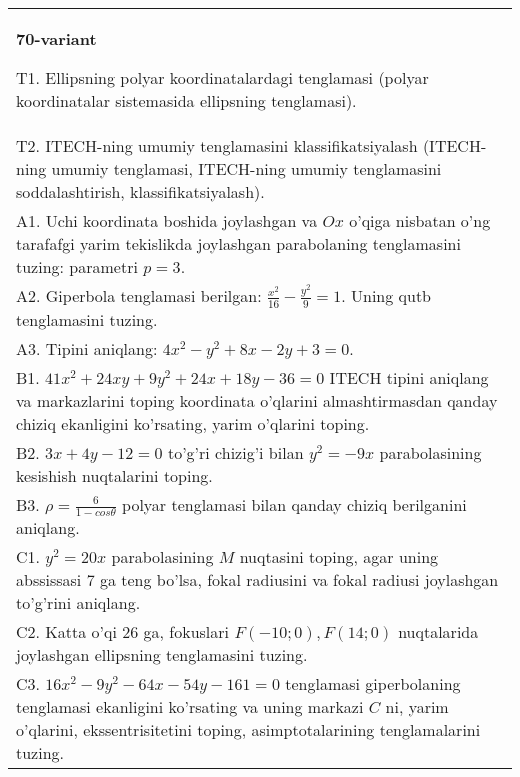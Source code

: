 \documentclass{article}
\begin{document}
\begin{tabular}{m{17cm}}
\textbf{70-variant}
\newline

T1. Ellipsning polyar koordinatalardagi tenglamasi (polyar koordinatalar sistemasida ellipsning tenglamasi).\\

T2. ITECH-ning umumiy tenglamasini klassifikatsiyalash (ITECH-ning umumiy tenglamasi, ITECH-ning umumiy tenglamasini soddalashtirish, klassifikatsiyalash).\\

A1. Uchi koordinata boshida joylashgan va $Ox$ o'qiga nisbatan o'ng tarafafgi yarim tekislikda joylashgan parabolaning tenglamasini tuzing: parametri $p=3$.\\

A2. Giperbola tenglamasi berilgan: $\frac{x^{2}}{16}-\frac{y^{2}}{9}=1$. Uning qutb tenglamasini tuzing.\\

A3. Tipini aniqlang: $4x^{2}-y^{2}+8x-2y+3=0$.\\

B1. $41x^{2} + 24xy + 9y^{2} + 24x + 18y - 36 = 0$ ITECH tipini aniqlang va markazlarini toping koordinata o'qlarini almashtirmasdan qanday chiziq ekanligini ko'rsating, yarim o'qlarini toping.  \\

B2. $3x + 4y - 12 = 0$ to'g'ri chizig'i bilan $y^{2} = - 9x$ parabolasining kesishish nuqtalarini toping.  \\

B3. $\rho = \frac{6}{1 - cos\theta}$ polyar tenglamasi bilan qanday chiziq berilganini aniqlang.  \\

C1. $y^{2} = 20x$ parabolasining $M$ nuqtasini toping, agar uning abssissasi 7 ga teng bo'lsa, fokal radiusini va fokal radiusi joylashgan to'g'rini aniqlang.\\

C2. Katta o'qi 26 ga, fokuslari $F( - 10;0), F(14;0)$ nuqtalarida joylashgan ellipsning tenglamasini tuzing.  \\

C3. $16x^{2} - 9y^{2} - 64x - 54y - 161 = 0$ tenglamasi giperbolaning tenglamasi ekanligini ko'rsating va uning markazi $C$ ni, yarim o'qlarini, ekssentrisitetini toping, asimptotalarining tenglamalarini tuzing.  \\

\end{tabular}
\vspace{1cm}
\end{document}

